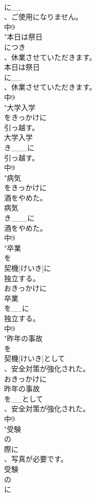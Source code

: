\documentclass[8pt]{extreport}
\begin{document}
\begin{CJK}{UTF8}{min}
\\	に__
\\	、ご使用になりません。
\\	中9
\\	"本日は祭日
\\	につき
\\	、休業させていただきます。
\\	本日は祭日
\\	に__
\\	、休業させていただきます。
\\	中9
\\	"大学入学
\\	をきっかけに
\\	引っ越す。
\\	大学入学
\\	き___に
\\	引っ越す。
\\	中9
\\	"病気
\\	をきっかけに
\\	酒をやめた。
\\	病気
\\	き___に
\\	酒をやめた。
\\	中9
\\	"卒業
\\	を
\\	契機[けいき]に
\\	独立する。
\\	おきっかけに	
\\	卒業
\\	を__に
\\	独立する。
\\	中9
\\	"昨年の事故
\\	を
\\	契機[けいき]として
\\	、安全対策が強化された。
\\	おきっかけに	
\\	昨年の事故
\\	を__として
\\	、安全対策が強化された。
\\	中9
\\	"受験
\\	の
\\	際に
\\	、写真が必要です。
\\	受験
\\	の
\\	に

\end{CJK}
\end{document}
